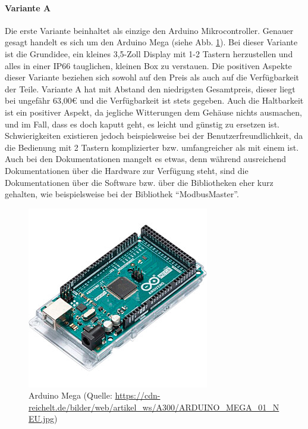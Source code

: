 \paragraph{Variante A}
Die erste Variante beinhaltet als einzige den Arduino Mikrocontroller. Genauer gesagt handelt es sich um den Arduino Mega (siehe Abb. \ref{fig:arduino_mega}). Bei dieser Variante ist die Grundidee, ein kleines 3,5-Zoll Display mit 1-2 Tastern herzustellen und alles in einer IP66 tauglichen, kleinen Box zu verstauen. 
Die positiven Aspekte dieser Variante beziehen sich sowohl auf den Preis als auch auf die Verfügbarkeit der Teile. Variante A hat mit Abstand den niedrigsten Gesamtpreis, dieser liegt bei ungefähr 63,00€ und die Verfügbarkeit ist stets gegeben. Auch die Haltbarkeit ist ein positiver Aspekt, da jegliche Witterungen dem Gehäuse nichts ausmachen, und im Fall, dass es doch kaputt geht, es leicht und günstig zu ersetzen ist. Schwierigkeiten existieren jedoch beispielsweise bei der Benutzerfreundlichkeit, da die Bedienung mit 2 Tastern komplizierter bzw. umfangreicher als mit einem ist. Auch bei den Dokumentationen mangelt es etwas, denn während ausreichend Dokumentationen über die Hardware zur Verfügung steht, sind die Dokumentationen über die Software bzw. über die Bibliotheken eher kurz gehalten, wie beispielsweise bei der Bibliothek \enquote{ModbusMaster}.
\begin{figure}[ht]
	\centering
	\includegraphics[width=0.5\linewidth]{Bilder/ARDUINO_MEGA.jpg}
	\caption[Arduino Mega (Quelle: \url{https://cdn-reichelt.de/bilder/web/artikel_ws/A300/ARDUINO_MEGA_01_NEU.jpg}, Zugriff am 19.02.2024]{Arduino Mega (Quelle: \url{https://cdn-reichelt.de/bilder/web/artikel_ws/A300/ARDUINO_MEGA_01_NEU.jpg})}
	\label{fig:arduino_mega}
\end{figure}

